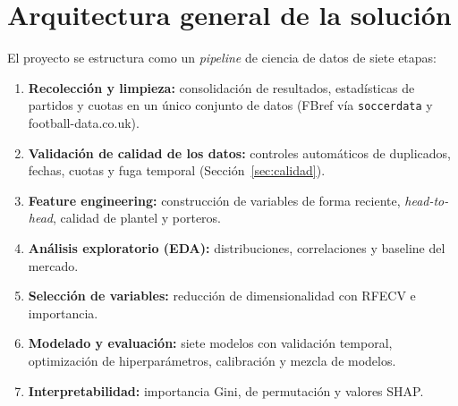 \documentclass[12pt,letterpaper,oneside]{report}
\begin{document}
\section{Arquitectura general de la solución}
El proyecto se estructura como un \textit{pipeline} de ciencia de datos de siete etapas:
\begin{enumerate}
\item \textbf{Recolección y limpieza:} consolidación de resultados, estadísticas de partidos y cuotas en un único conjunto de datos (FBref vía \texttt{soccerdata} y football-data.co.uk).
\item \textbf{Validación de calidad de los datos:} controles automáticos de duplicados, fechas, cuotas y fuga temporal (Sección~\ref{sec:calidad}).
\item \textbf{Feature engineering:} construcción de variables de forma reciente, \textit{head-to-head}, calidad de plantel y porteros.
\item \textbf{Análisis exploratorio (EDA):} distribuciones, correlaciones y baseline del mercado.
\item \textbf{Selección de variables:} reducción de dimensionalidad con RFECV e importancia.
\item \textbf{Modelado y evaluación:} siete modelos con validación temporal, optimización de hiperparámetros, calibración y mezcla de modelos.
\item \textbf{Interpretabilidad:} importancia Gini, de permutación y valores SHAP.
\end{enumerate}
\end{document}
